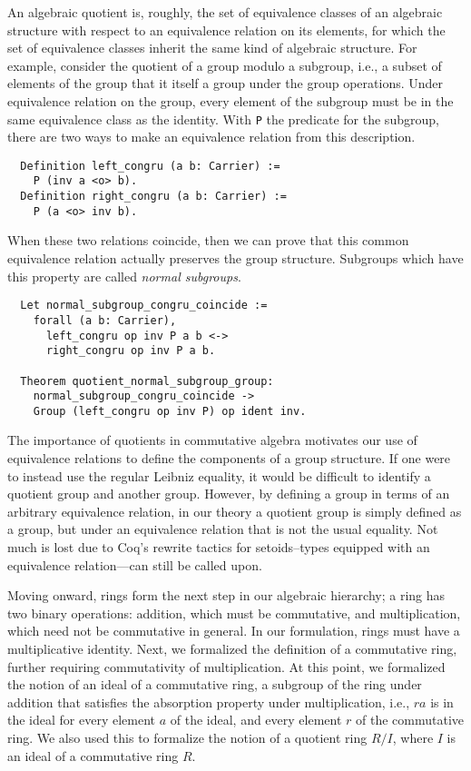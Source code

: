 \documentclass{article}
\begin{document}
An algebraic quotient is, roughly, the set of equivalence classes of an
algebraic structure with respect to an equivalence relation on its elements,
for which the set of equivalence classes inherit the same kind of algebraic
structure. For example, consider the quotient of a group modulo a subgroup,
i.e., a subset of elements of the group that it itself a group under the group
operations. Under equivalence relation on the group, every element of the
subgroup must be in the same equivalence class as the identity. With \texttt{P}
the predicate for the subgroup, there are two ways to make an equivalence
relation from this description.

\begin{verbatim}
  Definition left_congru (a b: Carrier) :=
    P (inv a <o> b).
  Definition right_congru (a b: Carrier) :=
    P (a <o> inv b).
\end{verbatim}

When these two relations coincide, then we can prove that this common
equivalence relation actually preserves the group structure. Subgroups which
have this property are called \emph{normal subgroups}.

\begin{verbatim}
  Let normal_subgroup_congru_coincide :=
    forall (a b: Carrier),
      left_congru op inv P a b <->
      right_congru op inv P a b.

  Theorem quotient_normal_subgroup_group:
    normal_subgroup_congru_coincide ->
    Group (left_congru op inv P) op ident inv.
\end{verbatim}

The importance of quotients in commutative algebra motivates our use of
equivalence relations to define the components of a group structure. If one
were to instead use the regular Leibniz equality, it would be difficult to
identify a quotient group and another group. However, by  defining a group in
terms of an arbitrary equivalence relation, in our theory a quotient group is 
simply defined as a group, but under an equivalence relation that is not the
usual equality. Not much is lost due to Coq's rewrite tactics for
setoids--types equipped with an equivalence relation---can still be called
upon.

Moving onward, rings form the next step in our algebraic hierarchy; a ring has
two binary operations: addition, which must be commutative, and multiplication,
which need not be commutative in general. In our formulation, rings must have a
multiplicative identity. Next, we formalized the definition of a commutative
ring, further requiring commutativity of multiplication. At this point, we
formalized the notion of an ideal of a commutative ring, a subgroup of the ring
under addition that satisfies the absorption property under multiplication,
i.e., \(r a\) is in the ideal for every element \(a\) of the ideal, and every
element \(r\) of the commutative ring. We also used this to formalize the
notion of a quotient ring $R/I$, where $I$ is an ideal of a commutative ring
$R$.
\end{document}
